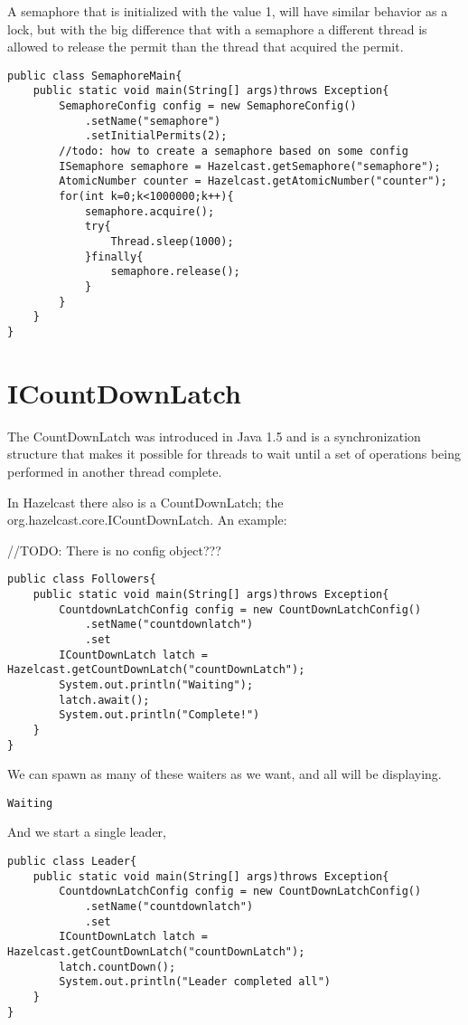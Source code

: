 A semaphore that is initialized with the value 1, will have similar behavior as a lock,
but with the big difference that with a semaphore a different thread is allowed to release
the permit than the thread that acquired the permit.

\begin{verbatim}
public class SemaphoreMain{
    public static void main(String[] args)throws Exception{
        SemaphoreConfig config = new SemaphoreConfig()
            .setName("semaphore")
            .setInitialPermits(2);
        //todo: how to create a semaphore based on some config
        ISemaphore semaphore = Hazelcast.getSemaphore("semaphore");
        AtomicNumber counter = Hazelcast.getAtomicNumber("counter");
        for(int k=0;k<1000000;k++){
            semaphore.acquire();
            try{
                Thread.sleep(1000);
            }finally{
                semaphore.release();
            }
        }
    }
}
\end{verbatim}

\section{ICountDownLatch}
The CountDownLatch was introduced in Java 1.5 and is a synchronization structure that makes it
possible for threads to wait until a set of operations being performed in another thread complete.

In Hazelcast there also is a CountDownLatch; the org.hazelcast.core.ICountDownLatch. An example:

//TODO: There is no config object???

\begin{verbatim}
public class Followers{
    public static void main(String[] args)throws Exception{
        CountdownLatchConfig config = new CountDownLatchConfig()
            .setName("countdownlatch")
            .set
        ICountDownLatch latch = Hazelcast.getCountDownLatch("countDownLatch");
        System.out.println("Waiting");
        latch.await();
        System.out.println("Complete!")
    }
}
\end{verbatim}
We can spawn as many of these waiters as we want, and all will be displaying.

\begin{verbatim}
Waiting
\end{verbatim}

And we start a single leader, 
\begin{verbatim}
public class Leader{
    public static void main(String[] args)throws Exception{
        CountdownLatchConfig config = new CountDownLatchConfig()
            .setName("countdownlatch")
            .set
        ICountDownLatch latch = Hazelcast.getCountDownLatch("countDownLatch");
        latch.countDown();
		System.out.println("Leader completed all")
    }
}
\end{verbatim}

